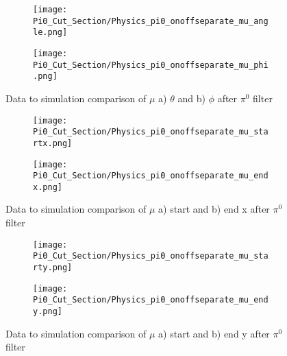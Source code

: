 \begin{figure}[H]
\centering
  \begin{subfigure}[t]{0.3\textwidth}
    \centering
\texttt{[image: Pi0\_Cut\_Section/Physics\_pi0\_onoffseparate\_mu\_angle.png]}
  \caption{ }
  \end{subfigure} 
  \hspace{10mm}
  \begin{subfigure}[t]{0.3\textwidth}
    \centering
\texttt{[image: Pi0\_Cut\_Section/Physics\_pi0\_onoffseparate\_mu\_phi.png]}
  \caption{ }
  \end{subfigure} 
\caption{ Data to simulation comparison of $\mu$ a) $\theta$ and b) $\phi$ after $\pi^0$ filter }

\label{fig:physics_pi0_mu_phi}
\end{figure}

\begin{figure}[H]
\centering
  \begin{subfigure}[t]{0.3\textwidth}
    \centering
\texttt{[image: Pi0\_Cut\_Section/Physics\_pi0\_onoffseparate\_mu\_startx.png]}
  \caption{ }
  \end{subfigure} 
  \hspace{30mm}
  \begin{subfigure}[t]{0.3\textwidth}
    \centering
\texttt{[image: Pi0\_Cut\_Section/Physics\_pi0\_onoffseparate\_mu\_endx.png]}
  \caption{ }
  \end{subfigure} 
\caption{ Data to simulation comparison of $\mu$ a) start and b) end x after $\pi^0$ filter }
\label{fig:physics_pi0_mu_x}
\end{figure}

\begin{figure}[H]
\centering
  \begin{subfigure}[t]{0.3\textwidth}
    \centering
\texttt{[image: Pi0\_Cut\_Section/Physics\_pi0\_onoffseparate\_mu\_starty.png]}
  \caption{ }
  \end{subfigure} 
  \hspace{30mm}
  \begin{subfigure}[t]{0.3\textwidth}
    \centering
\texttt{[image: Pi0\_Cut\_Section/Physics\_pi0\_onoffseparate\_mu\_endy.png]}
  \caption{ }
  \end{subfigure} 
\caption{ Data to simulation comparison of $\mu$ a) start and b) end y after $\pi^0$ filter }
\label{fig:physics_pi0_mu_y}
\end{figure}

